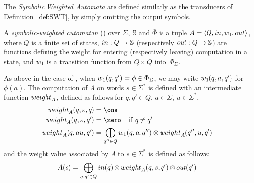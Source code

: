 \noindent
The \emph{Symbolic Weighted Automata} %
are defined similarly as the transducers of Definition~\ref{def:SWT},
by simply omitting the output symbols.
%
%
\begin{definition} \label{def:SWA}
A \emph{symbolic-weighted automaton} (\SWA)
over $\Sigma$, $\mathbb{S}$ and $\bar\Phi$
is a tuple
$A = \< Q, \init, {\wei_1}, \final >$,
where $Q$ is a finite set of states,
$\mathsf{in} : Q \to \Semiring$ %
(respectively $\mathsf{out} : Q \to \Semiring$)  %
are functions defining the weight for entering
(respectively leaving) computation in a state,
and ${\wei_1}$ is a transition function
from $Q \times Q$ into~$\Phi_{\Sigma}$.
\end{definition}
%
\noindent
As above in the case of \SWT,
when $\wei_1(q, q') = \phi \in \Phi_\Sigma$,
we may write $\wei_1(q, a, q')$ for~$\phi(a)$.
The computation of $A$ on words $s \in \Sigma^*$
is defined with an intermediate function $\weight_A$,
defined as follows for $q, q' \in Q$, $a \in \Sigma$, $u \in \Sigma^*$,
%
\begin{align}
\weight_A(q, \varepsilon, q) & = \one\\ %
\weight_A(q, \varepsilon, q') & = \zero \quad \mathrm{if~} q \neq q'\nonumber\\
\weight_A(q, au, q') & =  \displaystyle\bigoplus_{q'' \in Q}
    \wei_{1}(q, a, q'') \otimes \weight_A(q'', u, q')\nonumber
\label{eq:SWA-weight}
\end{align}
%
\noindent
and the weight value associated by $A$ to
$s \in \Sigma^*$ is defined as follows: %
\begin{equation}
A(s)  =
\displaystyle\bigoplus_{q, q' \in Q} \init(q)
\mathop{\otimes} \weight_A(q, s, q') \mathop{\otimes} \final(q')
\label{eq:SWA-value}
\end{equation}


%


